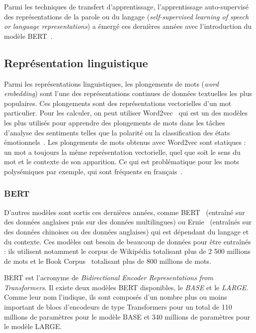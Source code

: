 Parmi les techniques de transfert d'apprentissage, l'apprentissage auto-supervisé des représentations de la parole ou du langage (\textit{self-supervised learning of speech or language representations}) a émergé ces dernières années avec l'introduction du modèle BERT~\cite{Devlin2019}.

\subsection{Représentation linguistique}
Parmi les représentations linguistiques, les plongements de mots (\textit{word embedding}) sont l'une des représentations continues de données textuelles les plus populaires. Ces plongements sont des représentations vectorielles d'un mot particulier. Pour les calculer, on peut utiliser Word2vec~\cite{word2vec} qui est un des modèles les plus utilisés pour apprendre des plongements de mots dans les tâches d'analyse des sentiments telles que la polarité ou la classification des états émotionnels~\cite{Rodrigo2020,Dong2018}. Les plongements de mots obtenus avec Word2vec sont statiques : un mot a toujours la même représentation vectorielle, quel que soit le sens du mot et le contexte de son apparition. Ce qui est problématique pour les mots polysémiques par exemple, qui sont fréquents en français~\cite{Pustejovsky1996}.

\subsubsection{BERT}
D'autres modèles sont sortis ces dernières années, comme BERT~\cite{Devlin2019} (entraîné sur des données anglaises puis sur des données multilingues) ou Ernie~\cite{Zhang2019Ernie} (entraînés sur des données chinoises ou des données anglaises) qui est dépendant du langage et du contexte. Ces modèles ont besoin de beaucoup de données pour être entraînés : ils utilisent notamment le corpus de Wikipédia totalisant plus de 2 500 millions de mots et le Book Corpus~\cite{Zhu2015} totalisant plus de 800 millions de mots.

BERT est l’acronyme de \textit{Bidirectional Encoder Representations from Transformers}. Il existe deux modèles BERT disponibles, le \textit{BASE} et le \textit{LARGE}. Comme leur nom l'indique, ils sont composés d'un nombre plus ou moins important de blocs d'encodeurs de type Transformers pour un total de 110 millions de paramètres pour le modèle BASE et 340 millions de paramètres pour le modèle LARGE.

